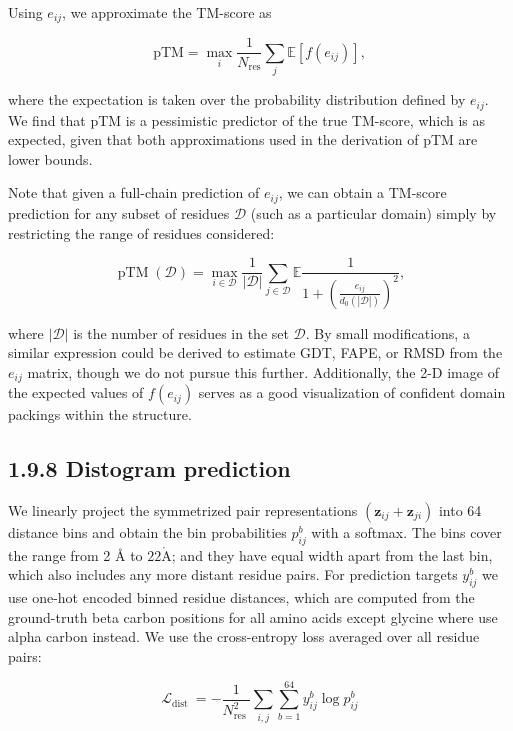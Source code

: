 \documentclass[10pt]{article}
\def\AA{\mathring{\mathrm{A}}}
\begin{document}
Using $e_{i j}$, we approximate the TM-score as


\begin{equation*}
\mathrm{pTM}=\max _{i} \frac{1}{N_{\mathrm{res}}} \sum_{j} \mathbb{E}\left[f\left(e_{i j}\right)\right], \tag{39}
\end{equation*}


where the expectation is taken over the probability distribution defined by $e_{i j}$. We find that pTM is a pessimistic predictor of the true TM-score, which is as expected, given that both approximations used in the derivation of pTM are lower bounds.

Note that given a full-chain prediction of $e_{i j}$, we can obtain a TM-score prediction for any subset of residues $\mathcal{D}$ (such as a particular domain) simply by restricting the range of residues considered:


\begin{equation*}
\operatorname{pTM}(\mathcal{D})=\max _{i \in \mathcal{D}} \frac{1}{|\mathcal{D}|} \sum_{j \in \mathcal{D}} \mathbb{E} \frac{1}{1+\left(\frac{e_{i j}}{d_{0}(|\mathcal{D}|)}\right)^{2}}, \tag{40}
\end{equation*}


where $|\mathcal{D}|$ is the number of residues in the set $\mathcal{D}$. By small modifications, a similar expression could be derived to estimate GDT, FAPE, or RMSD from the $e_{i j}$ matrix, though we do not pursue this further. Additionally, the 2-D image of the expected values of $f\left(e_{i j}\right)$ serves as a good visualization of confident domain packings within the structure.

\subsection*{1.9.8 Distogram prediction}
We linearly project the symmetrized pair representations $\left(\mathbf{z}_{i j}+\mathbf{z}_{j i}\right)$ into 64 distance bins and obtain the bin probabilities $p_{i j}^{b}$ with a softmax. The bins cover the range from 2 Å to $22 \AA$; and they have equal width apart from the last bin, which also includes any more distant residue pairs. For prediction targets $y_{i j}^{b}$ we use one-hot encoded binned residue distances, which are computed from the ground-truth beta carbon positions for all amino acids except glycine where use alpha carbon instead. We use the cross-entropy loss averaged over all residue pairs:


\begin{equation*}
\mathcal{L}_{\text {dist }}=-\frac{1}{N_{\text {res }}^{2}} \sum_{i, j} \sum_{b=1}^{64} y_{i j}^{b} \log p_{i j}^{b} \tag{41}
\end{equation*}
\end{document}
